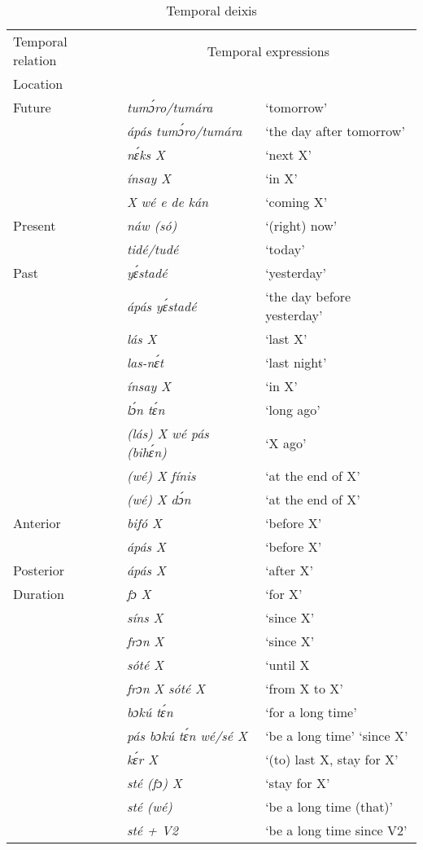 \begin{table}
\caption{Temporal deixis}
\label{tab:key:8.6}

\begin{tabularx}{\textwidth}{lXX}
\lsptoprule

Temporal relation & \multicolumn{2}{c}{Temporal expressions}\\
Location &  & \\
\midrule 
  Future & \itshape tumɔ́ro/tumára & ‘tomorrow’\\
& \itshape ápás tumɔ́ro/tumára & ‘the day after tomorrow’\\
& \itshape nɛ́ks X & ‘next X’\\
& \itshape ínsay X & ‘in X’\\
& \itshape X wé e de kán & ‘coming X’\\

\tablevspace
Present & \itshape náw (só) & ‘(right) now’\\
& \itshape tidé/tudé & ‘today’\\

\tablevspace
Past & \itshape yɛ́stadé & ‘yesterday’\\
& \itshape ápás yɛ́stadé & ‘the day before yesterday’\\
& \itshape lás X & ‘last X’\\
& \itshape las-nɛ́t & ‘last night’\\
& \itshape ínsay X & ‘in X’\\
& \itshape lɔ́n tɛ́n & ‘long ago’\\
& \itshape (lás) X wé pás (bihɛ́n) & ‘X ago’\\
& \itshape (wé) X fínis & ‘at the end of X’\\
& \itshape (wé) X dɔ́n & ‘at the end of X’\\

\tablevspace
Anterior & \itshape bifó X & ‘before X’\\
& \itshape ápás X & ‘before X’\\

\tablevspace
Posterior & \itshape ápás X & ‘after X’\\

\tablevspace
Duration & \itshape fɔ X & ‘for X’\\
& \itshape síns X & ‘since X’\\
& \itshape frɔn X & ‘since X’\\
& \itshape sóté X & ‘until X\\
& \itshape frɔn X sóté X & ‘from X to X’\\
& \itshape bɔkú tɛ́n & ‘for a long time’\\
& \itshape pás bɔkú tɛ́n wé/sé X & ‘be a long time’ ‘since X’\\
& \itshape kɛ́r X & ‘(to) last X, stay for X’\\
& \itshape sté (fɔ) X & ‘stay for X’\\
& \itshape sté (wé) & ‘be a long time (that)’\\
& \itshape sté + V2 & ‘be a long time since V2’\\


\end{tabularx}
\end{table}
